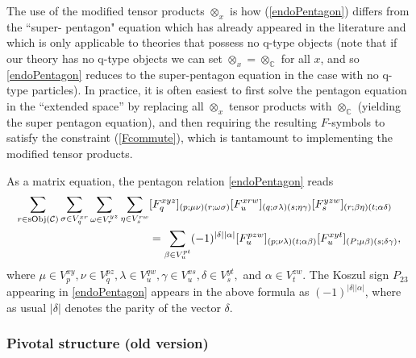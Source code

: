 \documentclass[12pt,a4paper]{article}
\newcommand{\tp}{\otimes}
\newcommand{\cc}{\mathbb{C}}
\newcommand{\mcc}{\mathcal{C}}
\newcommand\be            {\begin{equation}}
\newcommand\ee            {\end{equation}}
\begin{document}
The use of the modified tensor products $\tp_x$ is how (\ref{endoPentagon}) differs from the ``super-
pentagon" equation which has already appeared in the literature \cite{Gu2015, gaiotto2016, usher2016} 
and which is only applicable to theories that possess no q-type objects 
(note that if our theory has no q-type objects we can set $\tp_x = \tp_\cc$ for all $x$, and so 
\eqref{endoPentagon} reduces to the super-pentagon equation in the case with no q-type particles).
In practice, it is often easiest to first solve the pentagon equation in the ``extended space'' by replacing all 
$\tp_x$ tensor products with $\tp_\cc$ (yielding the super pentagon equation), and then requiring the 
resulting $F$-symbols to satisfy the constraint (\ref{Fcommute}), which is tantamount to implementing the 
modified tensor products.

As a matrix equation, the pentagon relation \eqref{endoPentagon} reads 
\be  \begin{aligned} \sum_{r\in {\rm sObj}(\mcc)}\sum_{\sigma\in V^{xr}_q}\sum_{\omega \in V^{yz}_r}\sum_{\eta\in V^{rw}_s}& [F^{xyz}_q]_{(p;\mu\nu)(r;\omega\sigma)}[F^{xrw}_u]_{(q;\sigma\lambda)(s;\eta\gamma)}[F^{yzw}_s]_{(r;\beta\eta)(t;\alpha\delta)} \\ & = \sum_{\beta \in V^{pt}_u}(-1)^{|\delta||\alpha|}[F^{pzw}_u]_{(p;\nu\lambda)(t;\alpha\beta)}[F^{xyt}_u]_{(P;\mu\beta)(s;\delta\gamma)}, \end{aligned} \ee
where $\mu\in V^{xy}_p,\nu\in V^{pz}_q,\lambda\in V^{qw}_u,\gamma\in V^{xs}_u,\delta\in V^{yt}_s,$ and $\alpha\in V^{zw}_t$. 
The Koszul sign $P_{23}$ appearing in \eqref{endoPentagon} appears in the above formula as $(-1)^{|\delta||\alpha|}$, where as usual $|\delta|$ denotes the parity 
of the vector $\delta$. 


\subsubsection{Pivotal structure (old version)}
\end{document}
